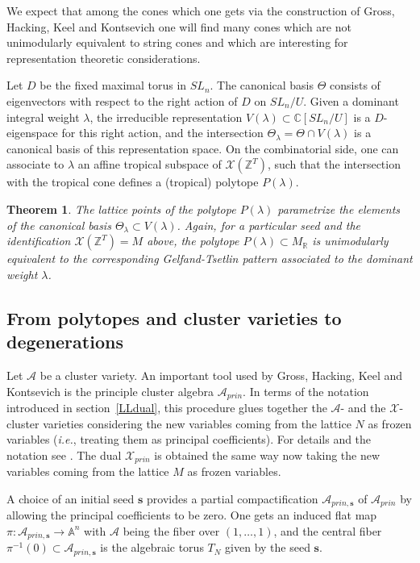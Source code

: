 \documentclass{emsprocart}
\newtheorem{theorem}{Theorem}[section]
\theoremstyle{definition}
\begin{document}
We expect that among the cones which one gets via the construction of Gross, Hacking, Keel and Kontsevich
one will find many cones which are not unimodularly equivalent to string cones and which are interesting for 
representation theoretic considerations.

Let $D$ be the fixed maximal torus in $SL_n$.  The canonical basis $\Theta$ consists of eigenvectors with respect to the right 
action of $D$ on $SL_n/U$. Given a dominant integral weight $\lambda$, the irreducible representation $V(\lambda)\subset \mathbb C[SL_n/U]$
is a $D$-eigenspace for this right action, and the intersection $\Theta_\lambda=\Theta\cap V(\lambda)$ is a canonical basis
of this representation space.
On the combinatorial side, one can associate to $\lambda$ an affine tropical subspace of $\mathcal X(\mathbb Z^T)$,
such that the intersection with the tropical cone defines a (tropical) polytope $P(\lambda)$. 
\begin{theorem}\cite{GHKK,M}
The lattice points of the polytope $P(\lambda)$
parametrize the elements of the canonical basis $\Theta_\lambda\subset V(\lambda)$. 
Again, for a particular seed and the identification
$\mathcal X(\mathbb Z^T)=M$ above, the polytope $P(\lambda)\subset M_{\mathbb R}$ is 
unimodularly equivalent to the corresponding Gelfand-Tsetlin pattern
associated to the dominant weight $\lambda$.
\end{theorem}
\subsection{From polytopes and cluster varieties to degenerations}\label{polyclusterdegen}
Let $\mathcal A$ be a cluster variety. An important tool used by  Gross, Hacking, Keel and Kontsevich
is the principle cluster algebra $\mathcal A_{prin}$. In terms of the notation introduced in section~\ref{LLdual},
this procedure glues together the $\mathcal{A}$- and the $\mathcal{X}$-cluster varieties considering the new variables coming from the lattice $N$ as frozen variables (\emph{i.e.}, treating them as principal coefficients). For details and the notation see \cite{GHK}. The dual $\mathcal X_{prin}$ is obtained the same way now taking the new variables coming from the lattice $M$ as frozen variables.

A choice of an initial seed $\mathbf s$ provides a partial compactification $\mathcal A_{prin,\mathbf s}$
of $\mathcal A_{prin}$ by allowing the principal coefficients to be zero.
One gets an induced flat map $\pi:\mathcal A_{prin,\mathbf s}\rightarrow \mathbb A^n$
with $\mathcal A$ being the fiber over $(1,\ldots,1)$, and the central fiber $\pi^{-1}(0) \subset \mathcal A_{prin,\mathbf s}$ 
is the algebraic torus $T_{N}$ given by the seed $\mathbf s$.
\end{document}
